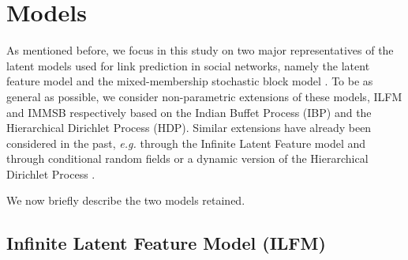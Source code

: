\section{Models}
\label{sec:models}

As mentioned before, we focus in this study on two major representatives of the latent models used for link prediction in social networks, namely the latent feature model \cite{BMF} and the mixed-membership stochastic block model \cite{MMSB}. To be as general as possible, we consider non-parametric extensions of these models, ILFM and IMMSB respectively based on the Indian Buffet Process (IBP) and the Hierarchical Dirichlet Process (HDP). Similar extensions have already been considered in the past, {\it e.g.} through the Infinite Latent Feature model \cite{ILFRM} and through conditional random fields \cite{iMMSB} or a dynamic version of the Hierarchical Dirichlet Process \cite{diMMSB}.

We now briefly describe the two models retained.


\subsection{Infinite Latent Feature Model (ILFM)}

